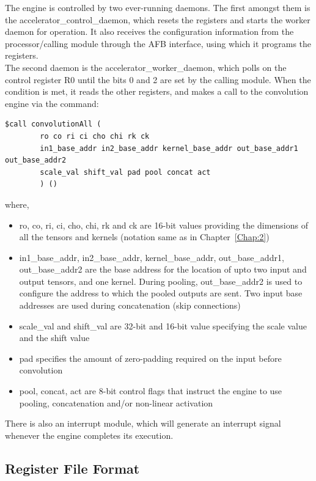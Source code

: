 \documentclass[a4paper,12pt, final]{report}
\begin{document}
The engine is controlled by two ever-running daemons. The first amongst them is the accelerator\_control\_daemon, which resets the registers and starts the worker daemon for operation. It also receives the configuration information from the processor/calling module through the AFB interface, using which it programs the registers.
\\

The second daemon is the accelerator\_worker\_daemon, which polls on the control register R0 until the bits 0 and 2 are set by the calling module. When the condition is met, it reads the other registers, and makes a call to the convolution engine via the command:
\\

\begin{Verbatim}
$call convolutionAll (
		ro co ri ci cho chi rk ck
		in1_base_addr in2_base_addr kernel_base_addr out_base_addr1 out_base_addr2
		scale_val shift_val pad pool concat act
		) ()
\end{Verbatim}
where,

\begin{itemize}
	\item ro, co, ri, ci, cho, chi, rk and ck are 16-bit values providing the dimensions of all the tensors and kernels (notation same as in Chapter~\ref{Chap:2})
	\item in1\_base\_addr, in2\_base\_addr, kernel\_base\_addr, out\_base\_addr1, out\_base\_addr2 are the base address for the location of upto two input and output tensors, and one kernel. During pooling, out\_base\_addr2 is used to configure the address to which the pooled outputs are sent. Two input base addresses are used during concatenation (skip connections)
	\item scale\_val and shift\_val are 32-bit and 16-bit value specifying the scale value and the shift value
	\item pad specifies the amount of zero-padding required on the input before convolution
	\item pool, concat, act are 8-bit control flags that instruct the engine to use pooling, concatenation and/or non-linear activation
\end{itemize}

There is also an interrupt module, which will generate an interrupt signal whenever the engine completes its execution.

\subsection{Register File Format}
\end{document}
